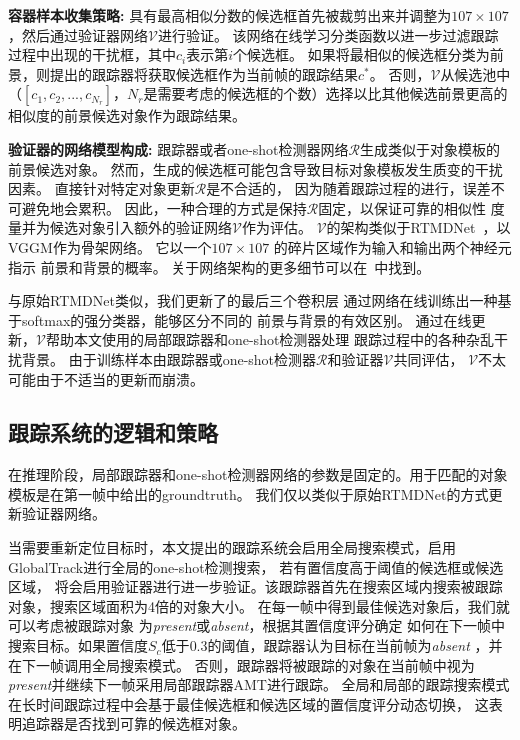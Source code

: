 \documentclass[promaster]{thesis-uestc}
\begin{document}
\noindent
\textbf{容器样本收集策略:} 具有最高相似分数的候选框首先被裁剪出来并调整为$107\times107$，然后通过验证器网络$\mathcal{V}$进行验证。
该网络在线学习分类函数以进一步过滤跟踪过程中出现的干扰框，其中$c_i$表示第$i$个候选框。
如果将最相似的候选框分类为前景，则提出的跟踪器将获取候选框作为当前帧的跟踪结果$c^*$。
否则，$\mathcal{V}$从候选池中（$[c_1, c_2, ... , c_{N_r}]$，$N_r$是需要考虑的候选框的个数）选择以比其他候选前景更高的相似度的前景候选对象作为跟踪结果。

\noindent
\textbf{验证器的网络模型构成:} 跟踪器或者one-shot检测器网络$\mathcal{R}$生成类似于对象模板的前景候选对象。
然而，生成的候选框可能包含导致目标对象模板发生质变的干扰因素。
直接针对特定对象更新$\mathcal{R}$是不合适的，
因为随着跟踪过程的进行，误差不可避免地会累积。
因此，一种合理的方式是保持$\mathcal{R}$固定，以保证可靠的相似性
度量并为候选对象引入额外的验证网络$\mathcal{V}$作为评估。
$ \mathcal{V}$的架构类似于RTMDNet~\cite{RTMDNet}，以VGGM作为骨架网络。
它以一个$107 \times 107$ 的碎片区域作为输入和输出两个神经元指示
前景和背景的概率。
关于网络架构的更多细节可以在~\cite{RTMDNet}中找到。

与原始RTMDNet类似，我们更新了的最后三个卷积层
通过网络在线训练出一种基于softmax的强分类器，能够区分不同的
前景与背景的有效区别。
通过在线更新，$\mathcal{V}$帮助本文使用的局部跟踪器和one-shot检测器处理
跟踪过程中的各种杂乱干扰背景。
由于训练样本由跟踪器或one-shot检测器$\mathcal{R}$和验证器$\mathcal{V}$共同评估，
$\mathcal{V}$不太可能由于不适当的更新而崩溃。

\subsection{跟踪系统的逻辑和策略}
在推理阶段，局部跟踪器和one-shot检测器网络的参数是固定的。用于匹配的对象模板是在第一帧中给出的groundtruth。
我们仅以类似于原始RTMDNet的方式更新验证器网络\cite{RTMDNet}。

当需要重新定位目标时，本文提出的跟踪系统会启用全局搜索模式，启用GlobalTrack进行全局的one-shot检测搜索，
若有置信度高于阈值的候选框或候选区域，
将会启用验证器进行进一步验证。该跟踪器首先在搜索区域内搜索被跟踪对象，搜索区域面积为4倍的对象大小。
在每一帧中得到最佳候选对象后，我们就可以考虑被跟踪对象
为\emph{present}或\emph{absent}，根据其置信度评分确定
如何在下一帧中搜索目标。如果置信度${S_c}$低于$0.3$的阈值，跟踪器认为目标在当前帧为\emph{absent}
，并在下一帧调用全局搜索模式。
否则，跟踪器将被跟踪的对象在当前帧中视为\emph{present}并继续下一帧采用局部跟踪器AMT进行跟踪。
全局和局部的跟踪搜索模式在长时间跟踪过程中会基于最佳候选框和候选区域的置信度评分动态切换，
这表明追踪器是否找到可靠的候选框对象。
\end{document}
